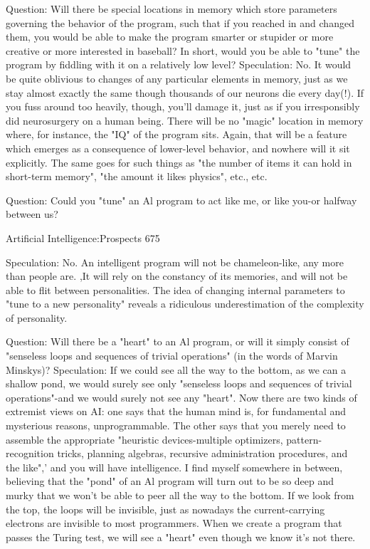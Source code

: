 Question: Will there be special locations in memory which store parameters governing
  the behavior of the program, such that if you reached in and changed them, you would
  be able to make the program smarter or stupider or more creative or more interested in
  baseball? In short, would you be able to "tune" the program by fiddling with it on a
  relatively low level?
  Speculation: No. It would be quite oblivious to changes of any particular elements in
     memory, just as we stay almost exactly the same though thousands of our neurons
     die every day(!). If you fuss around too heavily, though, you'll damage it, just as if
     you irresponsibly did neurosurgery on a human being. There will be no "magic"
     location in memory where, for instance, the "IQ" of the program sits. Again, that
     will be a feature which emerges as a consequence of lower-level behavior, and
     nowhere will it sit explicitly. The same goes for such things as "the number of
     items it can hold in short-term memory", "the amount it likes physics", etc., etc.

Question: Could you "tune" an Al program to act like me, or like you-or halfway between
us?




Artificial Intelligence:Prospects                                                        675

   Speculation: No. An intelligent program will not be chameleon-like, any more than
     people are. ,It will rely on the constancy of its memories, and will not be able to flit
     between personalities. The idea of changing internal parameters to "tune to a new
     personality" reveals a ridiculous underestimation of the complexity of personality.

Question: Will there be a "heart" to an Al program, or will it simply consist of "senseless
  loops and sequences of trivial operations" (in the words of Marvin Minskys)?
  Speculation: If we could see all the way to the bottom, as we can a shallow pond, we
     would surely see only "senseless loops and sequences of trivial operations"-and we
     would surely not see any "heart". Now there are two kinds of extremist views on
     AI: one says that the human mind is, for fundamental and mysterious reasons,
     unprogrammable. The other says that you merely need to assemble the appropriate
     "heuristic devices-multiple optimizers, pattern-recognition tricks, planning
     algebras, recursive administration procedures, and the like",' and you will have
     intelligence. I find myself somewhere in between, believing that the "pond" of an
     Al program will turn out to be so deep and murky that we won't be able to peer all
     the way to the bottom. If we look from the top, the loops will be invisible, just as
     nowadays the current-carrying electrons are invisible to most programmers. When
     we create a program that passes the Turing test, we will see a "heart" even though
     we know it's not there.

